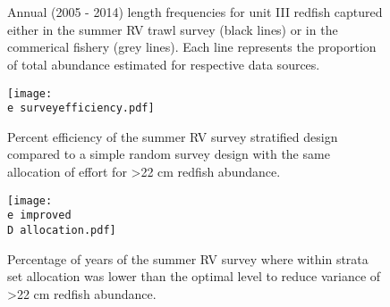 \documentclass[11pt]{article}
\newcommand{\D}{.}
\newcommand{\e}{/home/ecomod_data/redfish/figures/}
\begin{document}
\begin{landscape}
\begin{figure}
\centering
{}
\\
\\

\caption{Annual (2005 - 2014) length frequencies for unit III redfish captured either in the summer RV trawl survey (black lines) or in the commerical fishery (grey lines). Each line represents the proportion of total abundance estimated for respective data sources.}
\end{figure}
\clearpage
\end{landscape}
\begin{figure}
\centering
    \texttt{[image: \\e surveyefficiency.pdf]}
    \caption{Percent efficiency of the summer RV survey stratified design compared to a simple random survey design with the same allocation of effort for \textgreater 22 cm redfish abundance. }

\end{figure}
\clearpage

\begin{figure}
\centering
    \texttt{[image: \\e improved\\D allocation.pdf]}
    \caption{Percentage of years of the summer RV survey where within strata set allocation was lower than the optimal level to reduce variance of \textgreater 22 cm redfish abundance.}

\end{figure}
\clearpage
\end{document}
